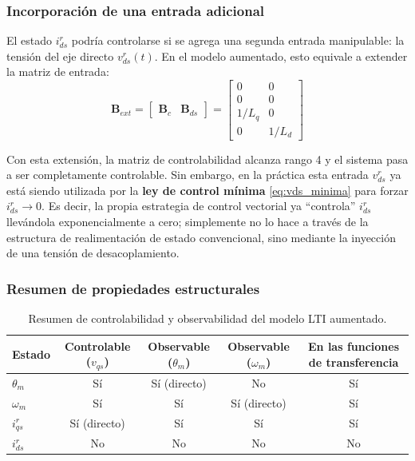 \documentclass[12pt, a4paper,journal, onecolumn, compsoc]{IEEEtran}
\begin{document}
\subsubsection{Incorporación de una entrada adicional}
El estado $i_{ds}^r$ podría controlarse si se agrega una segunda entrada manipulable: la tensión del eje directo $v_{ds}^r(t)$. En el modelo aumentado, esto equivale a extender la matriz de entrada:
\begin{equation}
    \bm{B}_{ext} = \begin{bmatrix} \bm{B}_c & \bm{B}_{ds} \end{bmatrix} =
    \begin{bmatrix}
    0 & 0 \\ 0 & 0 \\ 1/L_q & 0 \\ 0 & 1/L_d
    \end{bmatrix}
\end{equation}

Con esta extensión, la matriz de controlabilidad alcanza rango 4 y el sistema pasa a ser completamente controlable. Sin embargo, en la práctica esta entrada $v_{ds}^r$ ya está siendo utilizada por la \textbf{ley de control mínima} \eqref{eq:vds_minima} para forzar $i_{ds}^r \to 0$. Es decir, la propia estrategia de control vectorial ya ``controla'' $i_{ds}^r$ llevándola exponencialmente a cero; simplemente no lo hace a través de la estructura de realimentación de estado convencional, sino mediante la inyección de una tensión de desacoplamiento.

\subsubsection{Resumen de propiedades estructurales}

\begin{table}[H]
\centering
\caption{Resumen de controlabilidad y observabilidad del modelo LTI aumentado.}
\label{tab:ctrl_obs}
\renewcommand{\arraystretch}{1.3}
\begin{tabular}{|l|c|c|c|c|}
\hline
\textbf{Estado} & \textbf{Controlable} ($v_{qs}$) & \textbf{Observable} ($\theta_m$) & \textbf{Observable} ($\omega_m$) & \textbf{En las funciones de transferencia} \\
\hline
$\theta_m$   & Sí & Sí (directo) & No & Sí \\
$\omega_m$   & Sí & Sí           & Sí (directo) & Sí \\
$i_{qs}^r$     & Sí (directo) & Sí      & Sí & Sí \\
$i_{ds}^r$   & No & No            & No & No \\
\hline
\end{tabular}
\end{table}
\end{document}
